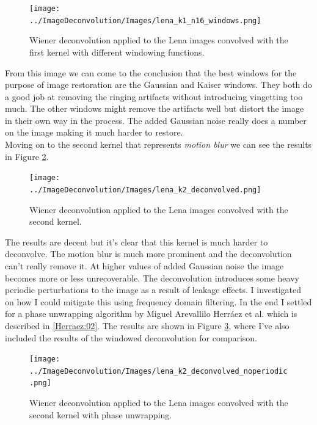 \documentclass[10pt, titlepage, a4paper]{article}
\begin{document}
\begin{figure}[H]
    \centering
    \texttt{[image: ../ImageDeconvolution/Images/lena\_k1\_n16\_windows.png]}
    \caption{Wiener deconvolution applied to the Lena images convolved with the first kernel with different windowing functions.}
    \label{fig:lena-1-windowing}
\end{figure}

From this image we can come to the conclusion that the best windows for the purpose of image restoration are the Gaussian 
and Kaiser windows. They both do a good job at removing the ringing artifacts without introducing vingetting too much. The other 
windows might remove the artifacts well but distort the image in their own way in the process. The added Gaussian noise 
really does a number on the image making it much harder to restore. \\

Moving on to the second kernel that represents \textit{motion blur} we can see the results in Figure \ref{fig:lena-2}.

\begin{figure}[H]
    \centering
    \texttt{[image: ../ImageDeconvolution/Images/lena\_k2\_deconvolved.png]}
    \caption{Wiener deconvolution applied to the Lena images convolved with the second kernel.}
    \label{fig:lena-2}
\end{figure}

The results are decent but it's clear that this kernel is much harder to deconvolve. The motion blur is much more prominent
and the deconvolution can't really remove it. At higher values of added Gaussian noise the image becomes more or less 
unrecoverable. The deconvolution introduces some heavy periodic perturbations to the image as a result of leakage effects.
I investigated on how I could mitigate this using frequency domain filtering. In the end I settled for a phase unwrapping 
algorithm by Miguel Arevallilo Herráez et al. which is described in \ref{Herraez:02}. The results are shown in Figure
\ref{fig:lena-2-unwrapping}, where I've also included the results of the windowed deconvolution for comparison.

\begin{figure}[H]
    \centering
    \texttt{[image: ../ImageDeconvolution/Images/lena\_k2\_deconvolved\_noperiodic.png]}
    \caption{Wiener deconvolution applied to the Lena images convolved with the second kernel with phase unwrapping.}
    \label{fig:lena-2-unwrapping}
\end{figure}
\end{document}
